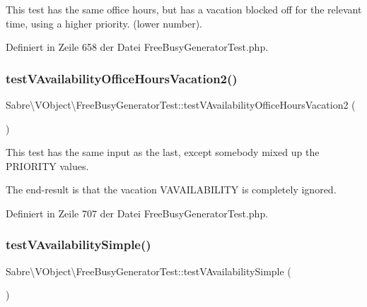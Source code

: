 This test has the same office hours, but has a vacation blocked off for the relevant time, using a higher priority. (lower number). 

Definiert in Zeile 658 der Datei Free\+Busy\+Generator\+Test.\+php.

\mbox{\label{class_sabre_1_1_v_object_1_1_free_busy_generator_test_a0ea2505f378168a038bb1022c131b644}} 
\subsubsection{\texorpdfstring{test\+V\+Availability\+Office\+Hours\+Vacation2()}{testVAvailabilityOfficeHoursVacation2()}}
{\footnotesize\ttfamily Sabre\textbackslash{}\+V\+Object\textbackslash{}\+Free\+Busy\+Generator\+Test\+::test\+V\+Availability\+Office\+Hours\+Vacation2 (\begin{DoxyParamCaption}{ }\end{DoxyParamCaption})}

This test has the same input as the last, except somebody mixed up the P\+R\+I\+O\+R\+I\+TY values.

The end-\/result is that the vacation V\+A\+V\+A\+I\+L\+A\+B\+I\+L\+I\+TY is completely ignored. 

Definiert in Zeile 707 der Datei Free\+Busy\+Generator\+Test.\+php.

\mbox{\label{class_sabre_1_1_v_object_1_1_free_busy_generator_test_a09ebf78663f4ce7381677ee86a8d441c}} 
\subsubsection{\texorpdfstring{test\+V\+Availability\+Simple()}{testVAvailabilitySimple()}}
{\footnotesize\ttfamily Sabre\textbackslash{}\+V\+Object\textbackslash{}\+Free\+Busy\+Generator\+Test\+::test\+V\+Availability\+Simple (\begin{DoxyParamCaption}{ }\end{DoxyParamCaption})}

